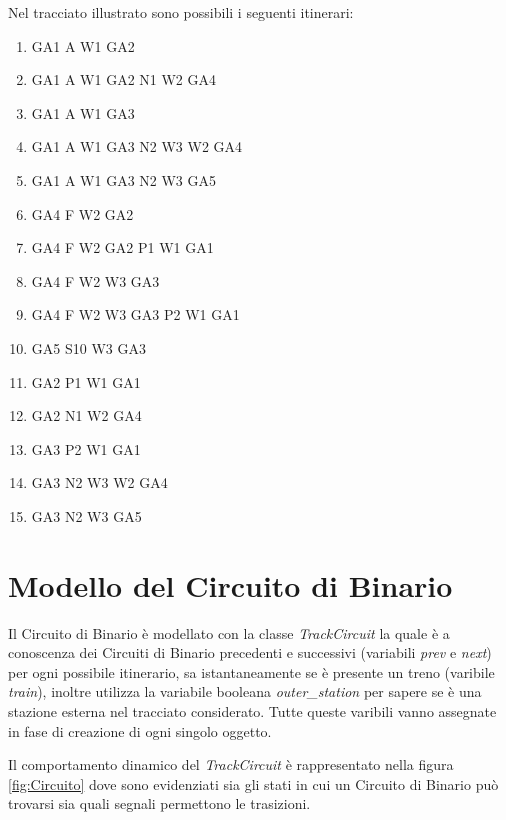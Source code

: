 Nel tracciato illustrato sono possibili i seguenti itinerari:
\begin{enumerate}
  \item GA1 A W1 GA2
  \item GA1 A W1 GA2 N1 W2 GA4
  \item GA1 A W1 GA3
  \item GA1 A W1 GA3 N2 W3 W2 GA4
  \item GA1 A W1 GA3 N2 W3 GA5
  \item GA4 F W2 GA2
  \item GA4 F W2 GA2 P1 W1 GA1
  \item GA4 F W2 W3 GA3
  \item GA4 F W2 W3 GA3 P2 W1 GA1
  \item GA5 S10 W3 GA3
  \item GA2 P1 W1 GA1
  \item GA2 N1 W2 GA4
  \item GA3 P2 W1 GA1
  \item GA3 N2 W3 W2 GA4
  \item GA3 N2 W3 GA5
\end{enumerate}

\section{Modello del Circuito di Binario}
Il Circuito di Binario è modellato con la classe \textit{TrackCircuit} la quale
è a conoscenza dei Circuiti di Binario precedenti e successivi (variabili
\textit{prev} e \textit{next}) per ogni possibile itinerario, sa istantaneamente
se è presente un treno (varibile \textit{train}), inoltre utilizza la variabile
booleana \textit{outer\_station} per sapere se è una stazione esterna nel
tracciato considerato. Tutte queste varibili vanno assegnate in fase di creazione di ogni
singolo oggetto.


Il comportamento dinamico del \textit{TrackCircuit} è rappresentato nella figura
\ref{fig:Circuito} dove sono evidenziati sia gli stati in cui un Circuito di Binario
può trovarsi sia quali segnali permettono le trasizioni.

